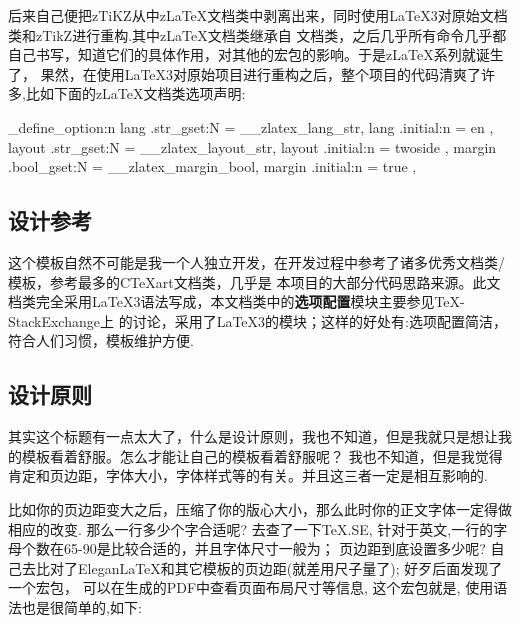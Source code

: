 \documentclass[
    lang=cn, 
    layout=oneside, 
    margin=false, 
    math-alias=true,
    toc={rename, 2column},
]{zlatex}
\let\cmd\zlatexVerb
\begin{document}
后来自己便把zTiKZ从中z\LaTeX{}文档类中剥离出来，同时使用\LaTeX{}3对原始文档类和zTikZ进行重构.其中z\LaTeX{}文档类继承自\cmd{book}
文档类，之后几乎所有命令几乎都自己书写，知道它们的具体作用，对其他的宏包的影响。于是z\LaTeX{}系列就诞生了，
果然，在使用\LaTeX3对原始项目进行重构之后，整个项目的代码清爽了许多,比如下面的z\LaTeX{}文档类选项声明:

\begin{codeprint}
\zlatex_define_option:n {
    lang                  .str_gset:N   =  \g__zlatex_lang_str,
    lang                  .initial:n    =  { en },
    layout                .str_gset:N   =  \g__zlatex_layout_str,
    layout                .initial:n    =  { twoside },
    margin                .bool_gset:N  =  \g__zlatex_margin_bool,
    margin                .initial:n    =  { true },
}
\end{codeprint}

\subsection{设计参考}
这个模板自然不可能是我一个人独立开发，在开发过程中参考了诸多优秀文档类/模板，参考最多的{C\TeX{}art}文档类，几乎是
本项目的大部分代码思路来源。此文档类完全采用\LaTeX3语法写成，本文档类中的\textbf{选项配置}模块主要参见\TeX-StackExchange上
的讨论，采用了\LaTeX3的\cmd{key-value}模块；这样的好处有:选项配置简洁，符合人们习惯，模板维护方便.


\subsection{设计原则}
其实这个标题有一点太大了，什么是设计原则，我也不知道，但是我就只是想让我的模板看着舒服。怎么才能让自己的模板看着舒服呢？
我也不知道，但是我觉得肯定和页边距，字体大小，字体样式等的有关。并且这三者一定是相互影响的. 

比如你的页边距变大之后，压缩了你的版心大小，那么此时你的正文字体一定得做相应的改变. 那么一行多少个字合适呢?
去查了一下\TeX.SE, 针对于英文,一行的字母个数在65-90是比较合适的，并且字体尺寸一般为\cmd{10pt,11pt,12pt}；
页边距到底设置多少呢? 自己去比对了Elegan\LaTeX{}和其它模板的页边距(就差用尺子量了); 好歹后面发现了一个宏包，
可以在生成的PDF中查看页面布局尺寸等信息, 这个宏包就是\cmd{fgruler}, 使用语法也是很简单的,如下:

\begin{codeprint}
\usepackage[hshift=0mm,vshift=0mm]{fgruler}
\end{codeprint}
\end{document}
